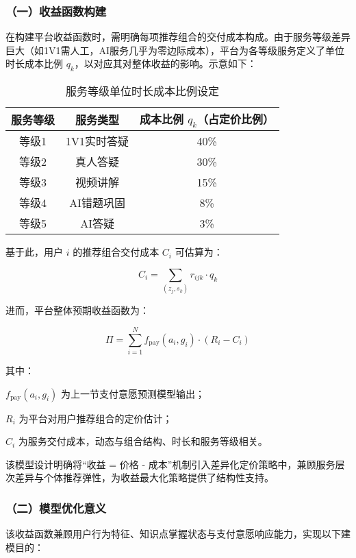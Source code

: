 \subsubsection*{（一）收益函数构建}

在构建平台收益函数时，需明确每项推荐组合的交付成本构成。由于服务等级差异巨大（如1V1需人工，AI服务几乎为零边际成本），平台为各等级服务定义了单位时长成本比例 $q_k$，以对应其对整体收益的影响。示意如下：

\begin{table}[!h]
\centering
\caption{服务等级单位时长成本比例设定}
\begin{tabular}{c c c}
\toprule
服务等级 & 服务类型 & 成本比例 $q_k$（占定价比例） \\
\midrule
等级1 & 1V1实时答疑 & 40\% \\
等级2 & 真人答疑 & 30\% \\
等级3 & 视频讲解 & 15\% \\
等级4 & AI错题巩固 & 8\% \\
等级5 & AI答疑 & 3\% \\
\bottomrule
\end{tabular}
\label{tab:cost_ratio_table}
\end{table}

基于此，用户 $i$ 的推荐组合交付成本 $C_i$ 可估算为：

\begin{equation}
C_i = \sum_{(z_j, s_k)} r_{ijk} \cdot q_k
\end{equation}

进而，平台整体预期收益函数为：

\begin{equation}
\Pi = \sum_{i=1}^{N} f_{\text{pay}}(a_i, g_i) \cdot (R_i - C_i)
\end{equation}

其中：

$f_{\text{pay}}(a_i, g_i)$ 为上一节支付意愿预测模型输出；

$R_i$ 为平台对用户推荐组合的定价估计；

$C_i$ 为服务交付成本，动态与组合结构、时长和服务等级相关。

该模型设计明确将“收益 = 价格 - 成本”机制引入差异化定价策略中，兼顾服务层次差异与个体推荐弹性，为收益最大化策略提供了结构性支持。


\subsubsection*{（二）模型优化意义}

该收益函数兼顾用户行为特征、知识点掌握状态与支付意愿响应能力，实现以下建模目的：

